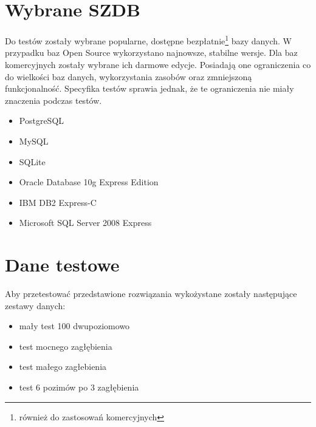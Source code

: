\section{Wybrane SZDB}

Do testów zostały wybrane popularne, dostępne bezpłatnie\footnote{również do zastosowań komercyjnych} bazy danych. 
W przypadku baz Open Source wykorzystano najnowsze, stabilne wersje.
Dla baz komercyjnych zostały wybrane ich darmowe edycje. Posiadają one
ograniczenia co do wielkości baz danych, wykorzystania zasobów oraz zmniejszoną funkcjonalność. 
Specyfika testów sprawia jednak, że te ograniczenia nie miały znaczenia podczas testów.


\begin{itemize}
 \item PostgreSQL
 \item MySQL
 \item SQLite
 \item Oracle Database 10g Express Edition
 \item IBM DB2 Express-C
 \item Microsoft SQL Server 2008 Express
\end{itemize}







% 



\section{Dane testowe}



Aby przetestować przedstawione rozwiązania wykożystane zostały następujące zestawy danych:
\begin{itemize}
 \item mały test 100 dwupoziomowo
 \item test mocnego zagłębienia
 \item test małego zagłebienia
 \item test 6 pozimów po 3 zagłębienia 
\end{itemize}


